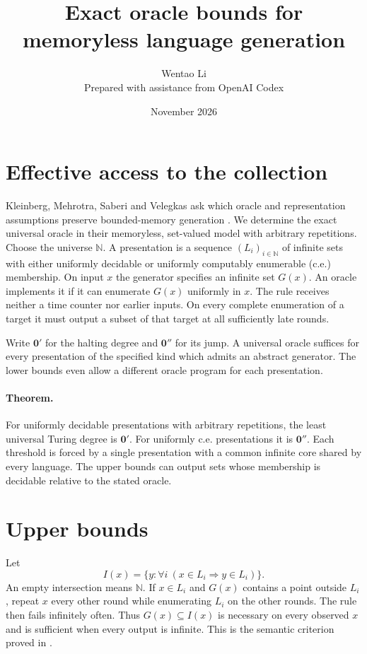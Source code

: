 \documentclass[11pt]{article}
\title{Exact oracle bounds for memoryless language generation}
\author{Wentao Li\\[2pt]\small Prepared with assistance from OpenAI Codex}
\date{November 2026}
\begin{document}
\maketitle
\section{Effective access to the collection}
Kleinberg, Mehrotra, Saberi and Velegkas ask which oracle and representation assumptions preserve bounded-memory generation \cite[\S6]{kmsv}. We determine the exact universal oracle in their memoryless, set-valued model with arbitrary repetitions. Choose the universe $\mathbb N$. A presentation is a sequence $(L_i)_{i\in\mathbb N}$ of infinite sets with either uniformly decidable or uniformly computably enumerable (c.e.) membership. On input $x$ the generator specifies an infinite set $G(x)$. An oracle implements it if it can enumerate $G(x)$ uniformly in $x$. The rule receives neither a time counter nor earlier inputs. On every complete enumeration of a target it must output a subset of that target at all sufficiently late rounds.

Write $\mathbf 0'$ for the halting degree and $\mathbf 0''$ for its jump. A universal oracle suffices for every presentation of the specified kind which admits an abstract generator. The lower bounds even allow a different oracle program for each presentation.

\paragraph{Theorem.} For uniformly decidable presentations with arbitrary repetitions, the least universal Turing degree is $\mathbf 0'$. For uniformly c.e. presentations it is $\mathbf 0''$. Each threshold is forced by a single presentation with a common infinite core shared by every language. The upper bounds can output sets whose membership is decidable relative to the stated oracle.

\section{Upper bounds}
Let
\[
 I(x)=\{y:\forall i\ (x\in L_i\Longrightarrow y\in L_i)\}.
\]
An empty intersection means $\mathbb N$. If $x\in L_i$ and $G(x)$ contains a point outside $L_i$, repeat $x$ every other round while enumerating $L_i$ on the other rounds. The rule then fails infinitely often. Thus $G(x)\subseteq I(x)$ is necessary on every observed $x$ and is sufficient when every output is infinite. This is the semantic criterion proved in \cite[Theorem 3.1]{kmsv}.
\end{document}
